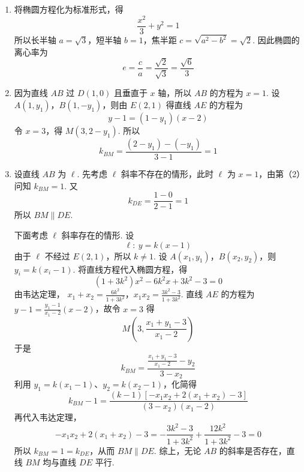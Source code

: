 \begin{solution}
\begin{enumerate}
\item 将椭圆方程化为标准形式，得
\[
\frac{x^2}{3}+y^2=1
\]
所以长半轴 \(a=\sqrt3\)，短半轴 \(b=1\)，焦半距 \(c=\sqrt{a^2-b^2}=\sqrt2\). 因此椭圆的离心率为
\[
e=\frac{c}{a}=\frac{\sqrt2}{\sqrt3}=\frac{\sqrt6}{3}
\]
\item 因为直线 \(AB\) 过 \(D(1,0)\) 且垂直于 \(x\) 轴，所以 \(AB\) 的方程为 \(x=1\). 设 \(A(1,y_1)\)，\(B(1,-y_1)\)，则由 \(E(2,1)\) 得直线 \(AE\) 的方程为
\[
y-1=(1-y_1)(x-2)
\]
令 \(x=3\)，得 \(M(3,2-y_1)\). 所以
\[
k_{BM}=\frac{(2-y_1)-(-y_1)}{3-1}=1
\]
\item 设直线 \(AB\) 为 \(\ell\). 先考虑 \(\ell\) 斜率不存在的情形，此时 \(\ell\) 为 \(x=1\)，由第（2）问知 \(k_{BM}=1\). 又
\[
k_{DE}=\frac{1-0}{2-1}=1
\]
所以 \(BM\parallel DE\).

下面考虑 \(\ell\) 斜率存在的情形. 设
\[
\ell:\ y=k(x-1)
\]
由于 \(\ell\) 不经过 \(E(2,1)\)，所以 \(k\ne1\). 设 \(A(x_1,y_1)\)，\(B(x_2,y_2)\)，则 \(y_i=k(x_i-1)\). 将直线方程代入椭圆方程，得
\[
(1+3k^2)x^2-6k^2x+3k^2-3=0
\]
由韦达定理，
\(x_1+x_2=\frac{6k^2}{1+3k^2}\)，\(x_1x_2=\frac{3k^2-3}{1+3k^2}\).
直线 \(AE\) 的方程为 \(y-1=\frac{y_1-1}{x_1-2}(x-2)\)，故令 \(x=3\) 得
\[
M\left(3,\frac{x_1+y_1-3}{x_1-2}\right)
\]
于是
\[
k_{BM}=\frac{\frac{x_1+y_1-3}{x_1-2}-y_2}{3-x_2}
\]
利用 \(y_1=k(x_1-1)\)、\(y_2=k(x_2-1)\)，化简得
\[
k_{BM}-1=\frac{(k-1)\left[-x_1x_2+2(x_1+x_2)-3\right]}{(3-x_2)(x_1-2)}
\]
再代入韦达定理，
\[
-x_1x_2+2(x_1+x_2)-3
=-\frac{3k^2-3}{1+3k^2}+\frac{12k^2}{1+3k^2}-3=0
\]
所以 \(k_{BM}=1=k_{DE}\)，从而 \(BM\parallel DE\). 综上，无论 \(AB\) 的斜率是否存在，直线 \(BM\) 均与直线 \(DE\) 平行.
\end{enumerate}
\end{solution}
